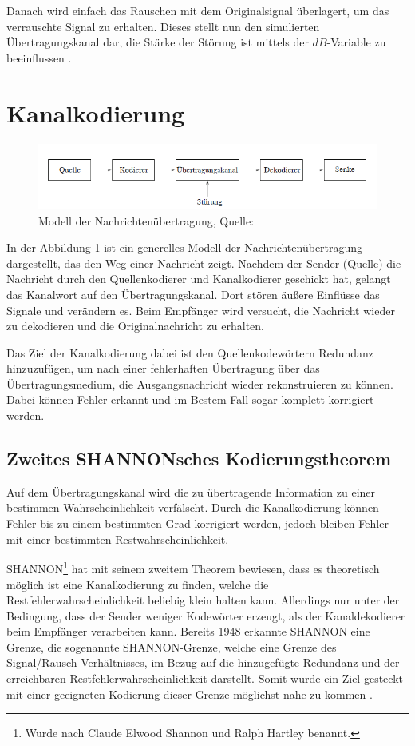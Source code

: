 Danach wird einfach das Rauschen mit dem Originalsignal überlagert, um das verrauschte Signal zu erhalten. Dieses stellt nun den simulierten Übertragungskanal dar, die Stärke der Störung ist mittels der $dB$-Variable zu beeinflussen \cite{AWGN}.

\section{Kanalkodierung}
\label{sec:channelcoding}

\begin{figure}[t]
\centering
\includegraphics[width=\ScaleIfNeeded]{pictures/Channelmodel}
\caption{Modell der Nachrichtenübertragung, Quelle: \cite[10]{schoenfeld2012informations}}
\label{pic:channelmodel}
\end{figure}

In der Abbildung \ref{pic:channelmodel} ist ein generelles Modell der Nachrichtenübertragung dargestellt, das den Weg einer Nachricht zeigt. Nachdem der Sender (Quelle) die Nachricht durch den Quellenkodierer und Kanalkodierer geschickt hat, gelangt das Kanalwort auf den Übertragungskanal. Dort stören äußere Einflüsse das Signale und verändern es. Beim Empfänger wird versucht, die Nachricht wieder zu dekodieren und die Originalnachricht zu erhalten.

Das Ziel der Kanalkodierung dabei ist den Quellenkodewörtern Redundanz hinzuzufügen, um nach einer fehlerhaften Übertragung über das Übertragungsmedium, die Ausgangsnachricht wieder rekonstruieren zu können. Dabei können Fehler erkannt und im Bestem Fall sogar komplett korrigiert werden.

\subsection{Zweites SHANNONsches Kodierungstheorem}
\label{sec:shannonTheorem}
Auf dem Übertragungskanal wird die zu übertragende Information zu einer bestimmen Wahrscheinlichkeit verfälscht. Durch die Kanalkodierung können Fehler bis zu einem bestimmten Grad korrigiert werden, jedoch bleiben Fehler mit einer bestimmten Restwahrscheinlichkeit.

SHANNON\footnote{Wurde nach Claude Elwood Shannon und Ralph Hartley benannt.} hat mit seinem zweitem Theorem bewiesen, dass es theoretisch möglich ist eine Kanalkodierung zu finden, welche die Restfehlerwahrscheinlichkeit beliebig klein halten kann. Allerdings nur unter der Bedingung, dass der Sender weniger Kodewörter erzeugt, als der Kanaldekodierer beim Empfänger verarbeiten kann. Bereits 1948 erkannte SHANNON eine Grenze, die sogenannte SHANNON-Grenze, welche eine Grenze des Signal/Rausch-Verhältnisses, im Bezug auf die hinzugefügte Redundanz und der erreichbaren Restfehlerwahrscheinlichkeit darstellt. Somit wurde ein Ziel gesteckt mit einer geeigneten Kodierung dieser Grenze möglichst nahe zu kommen \cite[125 f.]{schoenfeld2012informations}.

